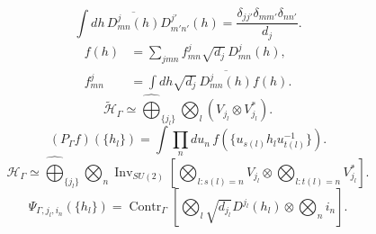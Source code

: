 \documentclass{article}
\newcommand{\Inv}{\operatorname{Inv}}
\newcommand{\Contr}{\operatorname{Contr}}
\begin{document}
\begin{equation}
\int dh\,\overline{D^j_{mn}(h)}D^{j'}_{m'n'}(h)=\frac{\delta_{jj'}\delta_{mm'}\delta_{nn'}}{d_j}.
\tag{S3}
\end{equation}
\begin{equation}
\begin{aligned}
f(h)&=\sum_{jmn}f^j_{mn}\sqrt{d_j}\,D^j_{mn}(h),\\
f^j_{mn}&=\int dh\sqrt{d_j}\,\overline{D^j_{mn}(h)}f(h).
\end{aligned}
\tag{S4}
\end{equation}
\begin{equation}
\widetilde{\mathcal H}_\Gamma\simeq\widehat{\bigoplus}_{\{j_l\}}\bigotimes_l(V_{j_l}\otimes V_{j_l}^*).
\tag{S5}
\end{equation}
\begin{equation}
(P_\Gamma f)(\{h_l\})=\int\prod_n du_n\,f(\{u_{s(l)}h_lu_{t(l)}^{-1}\}).
\tag{S6}
\end{equation}
\begin{equation}
\boxed{\mathcal H_\Gamma\simeq\widehat{\bigoplus}_{\{j_l\}}\bigotimes_n\Inv_{SU(2)}\left[\bigotimes_{l:s(l)=n}V_{j_l}\otimes\bigotimes_{l:t(l)=n}V_{j_l}^*\right].}
\tag{S7}
\end{equation}
\begin{equation}
\Psi_{\Gamma,j_l,i_n}(\{h_l\})=\Contr_\Gamma\left[\bigotimes_l\sqrt{d_{j_l}}D^{j_l}(h_l)\otimes\bigotimes_n i_n\right].
\tag{S8}
\end{equation}
\end{document}

